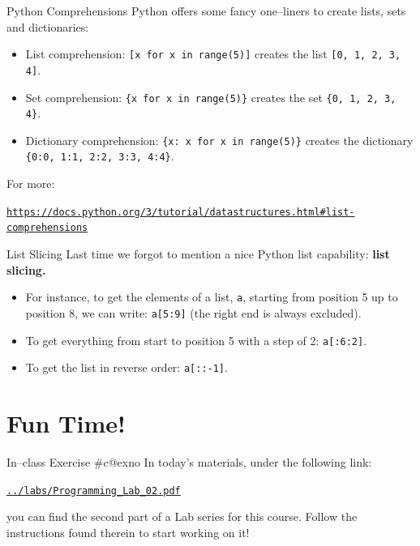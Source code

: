 \documentclass[aspectratio=169, 12pt, xcolor=table]{beamer}
\makeatletter
\newcommand{\ohref}[1]{\href{#1}{\texttt{#1}}}
\newcommand{\arabicthree}[1]{\expandafter\@arabicthree\csname c@#1\endcsname}
\newcommand{\@arabicthree}[1]{\ifnum #1<100 0\fi\ifnum #1<10 0\fi\number#1}
\newcounter{exno}
\newcommand{\exno}{\stepcounter{exno}In--class Exercise \#\arabicthree{exno}}
\makeatother
\begin{document}
	\begin{frame}{Python Comprehensions}
		Python offers some fancy one--liners to create lists, sets and dictionaries:
		\begin{itemize}
			\item List comprehension: \texttt{[x for x in range(5)]} creates the list \texttt{[0, 1, 2, 3, 4]}.
			\item Set comprehension: \texttt{\{x for x in range(5)\}} creates the set \texttt{\{0, 1, 2, 3, 4\}}.
			\item Dictionary comprehension: \texttt{\{x: x for x in range(5)\}} creates the dictionary \texttt{\{0:0, 1:1, 2:2, 3:3, 4:4\}}.
		\end{itemize}
		For more:
		\begin{scriptsize}
			\ohref{https://docs.python.org/3/tutorial/datastructures.html\#list-comprehensions}
		\end{scriptsize}
	\end{frame}
	
	\begin{frame}{List Slicing}
		Last time we forgot to mention a nice Python list capability: \textbf{list slicing.}
		\begin{itemize}
			\item For instance, to get the elements of a list, \texttt{a}, starting from position 5 up to position 8, we can write: \texttt{a[5:9]} (the right end is always excluded).
			\item To get everything from start to position 5 with a step of 2: \texttt{a[:6:2]}.
			\item To get the list in reverse order: \texttt{a[::-1]}.
		\end{itemize}
	\end{frame}
	
	\section{Fun Time!}\label{sec:fun-time}
	
	\sectionframe
	
	\setcounter{exno}{0}
	
	\begin{frame}{\exno}		
		In today's materials, under the following link:
		\begin{center}
			\ohref{../labs/Programming\_Lab\_02.pdf}
		\end{center}
		you can find the second part of a Lab series for this course. Follow the instructions found therein to start working on it!
	\end{frame}
	
\end{document}
